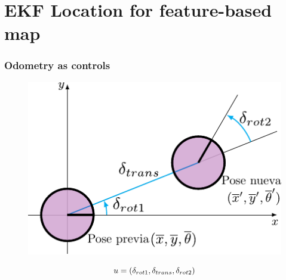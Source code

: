    \section{EKF Location for feature-based map}
   
\begin{frame}
    \frametitle{Odometry as controls}
   
    \begin{figure}[!h]
        \includegraphics[width=0.6\columnwidth]{./images/odometry_as_controls.pdf}
    \end{figure}
   
    \begin{equation*}
    u = (\delta _{rot1}, \delta _{trans}, \delta _{rot2})
    \end{equation*}
   
\end{frame}
   

